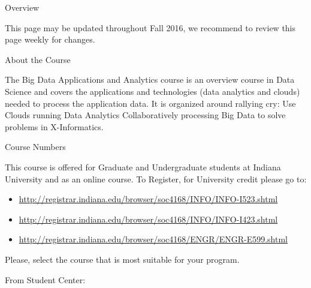 \begin{edXchapter}{Overview}\label{overview}

This page may be updated throughout Fall 2016, we recommend to review
this page weekly for changes.

\begin{edXsection}{About the Course}\label{about-the-course}


The Big Data Applications and Analytics course is an overview course in
Data Science and covers the applications and technologies (data
analytics and clouds) needed to process the application data. It is
organized around rallying cry: Use Clouds running Data Analytics
Collaboratively processing Big Data to solve problems in X-Informatics.

\end{edXsection}
\begin{edXsection}{Course Numbers}\label{course-numbers}


This course is offered for Graduate and Undergraduate students at
Indiana University and as an online course. To Register, for University
credit please go to:

\begin{itemize}
\item  \url{http://registrar.indiana.edu/browser/soc4168/INFO/INFO-I523.shtml}
\item  \url{http://registrar.indiana.edu/browser/soc4168/INFO/INFO-I423.shtml}
\item  \url{http://registrar.indiana.edu/browser/soc4168/ENGR/ENGR-E599.shtml}
\end{itemize}

Please, select the course that is most suitable for your program.

From Student Center:


\end{edXsection}
\end{edXchapter}
